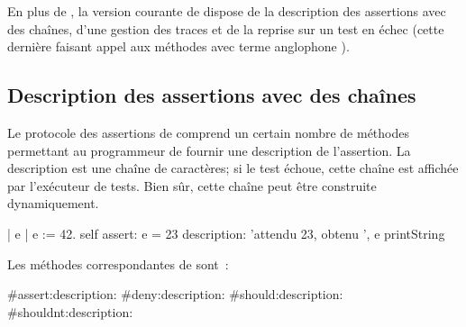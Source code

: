 \documentclass[a4paper,10pt,twoside]{book}
\begin{document}
En plus de , la version courante de \sunit dispose de la description des assertions avec des chaînes, d'une gestion des traces et de la reprise sur un test en échec 
(cette dernière faisant appel aux méthodes avec terme anglophone ).  

\subsection{Description des assertions avec des chaînes } %

Le protocole des assertions de  comprend un certain nombre de méthodes permettant au programmeur de fournir une description de l'assertion. La description est une chaîne de caractères; si le test échoue, cette chaîne est affichée par l'exécuteur de tests. Bien sûr, cette chaîne peut être construite dynamiquement.
\begin{code}{}
| e |
e := 42.
self assert: e = 23
	description: 'attendu 23, obtenu ', e printString
\end{code}

Les méthodes correspondantes  de  sont~:
\begin{code}{}
#assert:description:
#deny:description:
#should:description:
#shouldnt:description:
\end{code}
\end{document}
